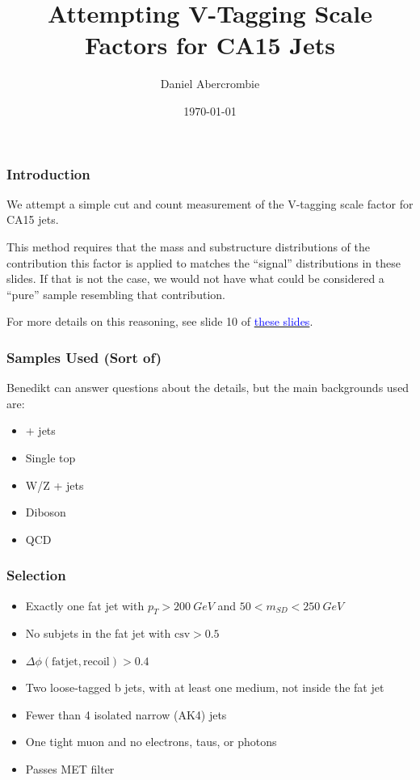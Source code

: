 \documentclass{beamer}
\author[D. Abercrombie]{
  Daniel Abercrombie
}
\title{\bf \sffamily Attempting V-Tagging Scale Factors for CA15 Jets}
\date{\today}
\begin{document}
\begin{frame}[nonumbering]
  \titlepage
\end{frame}

\begin{frame}
  \frametitle{Introduction}

  We attempt a simple cut and count measurement of the V-tagging scale factor for CA15 jets.

  This method requires that the mass and substructure distributions of the contribution this factor is applied to
  matches the ``signal'' distributions in these slides.
  If that is not the case, we would not have what could be considered a ``pure'' sample resembling that contribution.

  For more details on this reasoning, see slide 10 of
  \href{http://t3serv001.mit.edu/~dabercro/docs/WTagStudy/dabercro_WTagStudy_160727.pdf}
       {\textcolor{blue}{these slides}}.

\end{frame}

\begin{frame}
  \frametitle{Samples Used (Sort of)}

  Benedikt can answer questions about the details, but the main backgrounds used are:

  \begin{itemize}
  \item \ttbar + jets
  \item Single top
  \item W/Z + jets
  \item Diboson
  \item QCD
  \end{itemize}

\end{frame}

\begin{frame}
  \frametitle{Selection}

  \begin{itemize}
  \item Exactly one fat jet with $p_T > \SI{200}{GeV}$ and $50 < m_{SD} < \SI{250}{GeV}$
  \item No subjets in the fat jet with $\mathrm{csv} > 0.5$
  \item $\Delta\phi\mathrm{(fat jet, recoil)} > 0.4$
  \item Two loose-tagged b jets, with at least one medium, not inside the fat jet
  \item Fewer than 4 isolated narrow (AK4) jets
  \item One tight muon and no electrons, taus, or photons
  \item Passes MET filter
  \end{itemize}

\end{frame}
\end{document}
